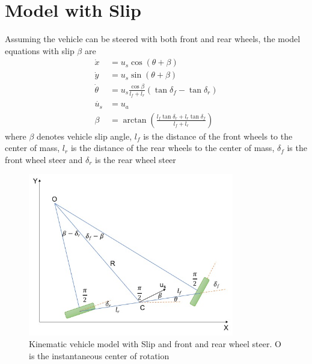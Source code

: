 \section{Model with Slip}
Assuming the vehicle can be steered with both front and rear wheels, the model equations with slip $\beta$ are
\begin{align}
\dot{x} &= u_s\cos(\theta+\beta) \\
\dot{y} &= u_s\sin(\theta+\beta) \\
\dot{\theta} &= u_s\frac{\cos{\beta}}{l_f+l_r}(\tan\delta_f - \tan\delta_r) \\
\dot{u_s} &= u_a \\
\beta & = \arctan(\frac{l_f\tan\delta_r+l_r\tan\delta_f}{l_f+l_r})
\end{align}
where $\beta$ denotes vehicle slip angle, $l_f$ is the distance of the front wheels to the center of mass, $l_r$ is the distance of the rear wheels to the center of mass, $\delta_f$ is the front wheel steer and $\delta_r$ is the rear wheel steer
\begin{figure}[!ht]
\centering
 \includegraphics[width=0.8\textwidth]{slip_kinematic_model.jpg}   
\caption{Kinematic vehicle model with Slip and front and rear wheel steer. O is the instantaneous center of rotation} \label{fig:slip_kin_model}
\end{figure}

